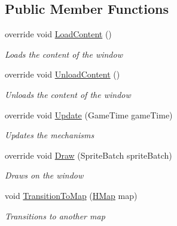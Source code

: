 \subsection*{Public Member Functions}
\begin{DoxyCompactItemize}
\item 
override void \hyperlink{class_hel_project_1_1_u_i_1_1_play_screen_af3639840bdd8de714d262377c417ee20}{Load\+Content} ()
\begin{DoxyCompactList}\small\item\em Loads the content of the window \end{DoxyCompactList}\item 
override void \hyperlink{class_hel_project_1_1_u_i_1_1_play_screen_a90c75361ad40bff449d2a560ef8f4464}{Unload\+Content} ()
\begin{DoxyCompactList}\small\item\em Unloads the content of the window \end{DoxyCompactList}\item 
override void \hyperlink{class_hel_project_1_1_u_i_1_1_play_screen_a012a79b297f9e09a0d21dbe952a653db}{Update} (Game\+Time game\+Time)
\begin{DoxyCompactList}\small\item\em Updates the mechanisms \end{DoxyCompactList}\item 
override void \hyperlink{class_hel_project_1_1_u_i_1_1_play_screen_a0f290e8d07d6632fd53a66efc585e853}{Draw} (Sprite\+Batch sprite\+Batch)
\begin{DoxyCompactList}\small\item\em Draws on the window \end{DoxyCompactList}\item 
void \hyperlink{class_hel_project_1_1_u_i_1_1_play_screen_a0b4785cbfbf29d287b40c003a2b0001d}{Transition\+To\+Map} (\hyperlink{class_hel_project_1_1_game_world_1_1_map_1_1_h_map}{H\+Map} map)
\begin{DoxyCompactList}\small\item\em Transitions to another map \end{DoxyCompactList}\end{DoxyCompactItemize}
